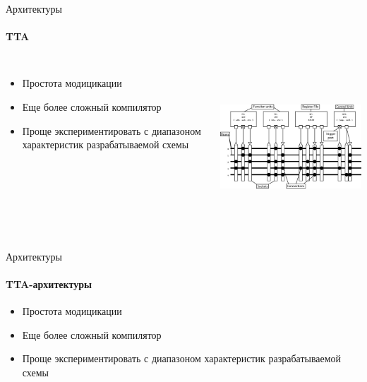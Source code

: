 \documentclass{beamer}              %
\begin{document}
\begin{frame}{Архитектуры}
  \framesubtitle{TTA}
  
  \begin{columns}
       \begin{itemize}
          \item Простота модицикации
          \item Еще более сложный компилятор
          \item Проще экспериментировать с диапазоном характеристик разрабатываемой схемы
  	\end{itemize}

      \begin{block}{}
        \includegraphics[height=6cm]{img/TTAExample.png}
      \end{block}
  \end{columns}	
\end{frame}

\begin{frame}{Архитектуры}
  \framesubtitle{TTA-архитектуры}
   \begin{itemize}
          \item Простота модицикации
          \item Еще более сложный компилятор
          \item Проще экспериментировать с диапазоном характеристик разрабатываемой схемы
  	\end{itemize}
  \nocite{Corporaal1994}
\end{frame}

%  

\end{document}
